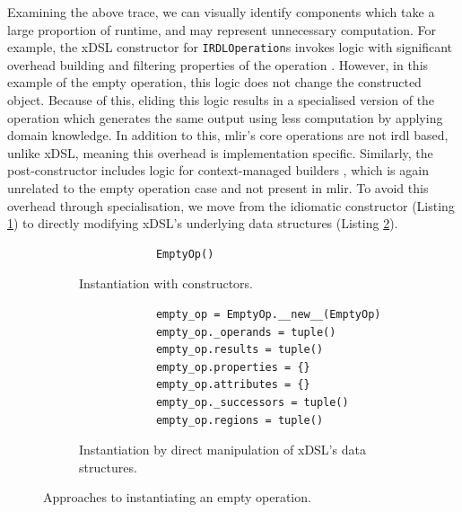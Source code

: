 Examining the above trace, we can visually identify components which take a large proportion of runtime, and may represent unnecessary computation.
For example, the xDSL constructor for \texttt{IRDLOperation}s invokes logic with significant overhead building and filtering properties of the operation . However, in this example of the empty operation, this logic does not change the constructed object. Because of this, eliding this logic results in a specialised version of the operation which generates the same output using less computation by applying domain knowledge.
In addition to this, \ac{mlir}'s core operations are not \ac{irdl} based, unlike xDSL, meaning this overhead is implementation specific.
Similarly, the post-constructor includes logic for context-managed builders , which is again unrelated to the empty operation case and not present in \ac{mlir}.
To avoid this overhead through specialisation, we move from the idiomatic constructor (Listing \ref{listing:ubenchmark-xdsl-constant-constructor}) to directly modifying xDSL's underlying data structures (Listing \ref{listing:ubenchmark-xdsl-constant-direct}).


\begin{figure}[H]
    \begin{subfigure}[b]{0.5\textwidth}
       \centering
        \begin{verbatim}
            EmptyOp()
        \end{verbatim}
        \footnotesize\vspace{4em}
        \caption{Instantiation with constructors.}
        \label{listing:ubenchmark-xdsl-constant-constructor}
    \end{subfigure}
    \hfill
    \begin{subfigure}[b]{0.5\textwidth}
        \centering
        \begin{verbatim}
            empty_op = EmptyOp.__new__(EmptyOp)
            empty_op._operands = tuple()
            empty_op.results = tuple()
            empty_op.properties = {}
            empty_op.attributes = {}
            empty_op._successors = tuple()
            empty_op.regions = tuple()
        \end{verbatim}
        \caption{Instantiation by direct manipulation of xDSL's data structures.}
        \label{listing:ubenchmark-xdsl-constant-direct}
    \end{subfigure}
    \captionsetup{name=Listing}
    \caption{Approaches to instantiating an empty operation.}
    \label{listing:ubenchmark-xdsl-constant}
\end{figure}


